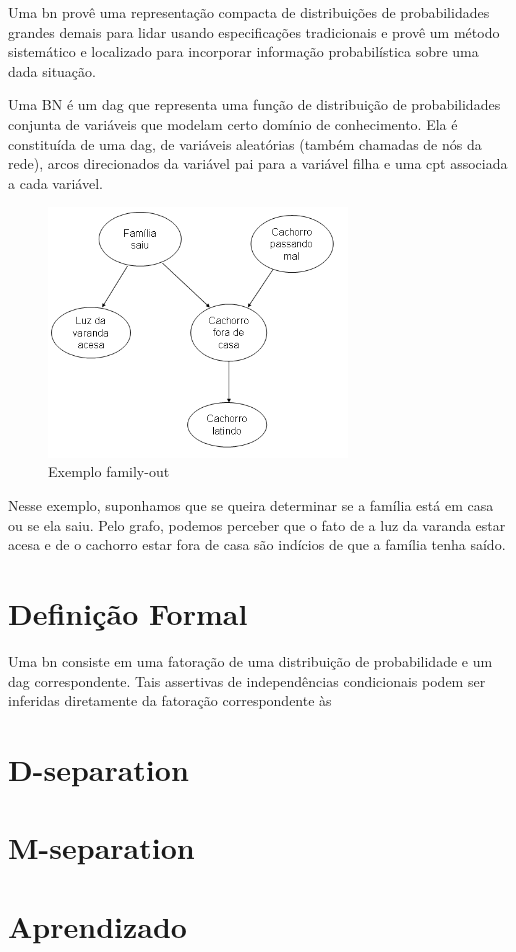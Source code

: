 
Uma \gls{bn} provê uma representação compacta de distribuições de probabilidades grandes demais para lidar usando especificações tradicionais e provê um método sistemático e localizado para incorporar informação probabilística sobre uma dada situação.

Uma BN é um \gls{dag} que representa uma função de distribuição de probabilidades conjunta de variáveis que modelam certo domínio de conhecimento. Ela é constituída de uma \gls{dag}, de variáveis aleatórias (também chamadas de nós da rede), arcos direcionados da variável pai para a variável filha e uma \gls{cpt} associada a cada variável.
\begin{figure}[H]
	\centering
	\includegraphics[width = 300px]{figuras/BN1}
	\caption[extraída do artigo do Laecio]{Exemplo family-out}
	\label{fig:familyBN}
\end{figure}

Nesse exemplo, suponhamos que se queira determinar se a família está em casa ou se ela saiu. Pelo grafo, podemos perceber que o fato de a luz da varanda estar acesa e de o cachorro estar fora de casa são indícios de que a família tenha saído. 

\section{Definição Formal}
Uma \gls{bn} consiste em uma fatoração de uma distribuição de probabilidade e um \gls{dag} correspondente. Tais assertivas de independências condicionais podem ser inferidas diretamente da fatoração correspondente às 

\section{D-separation}

\section{M-separation}

\section{Aprendizado}